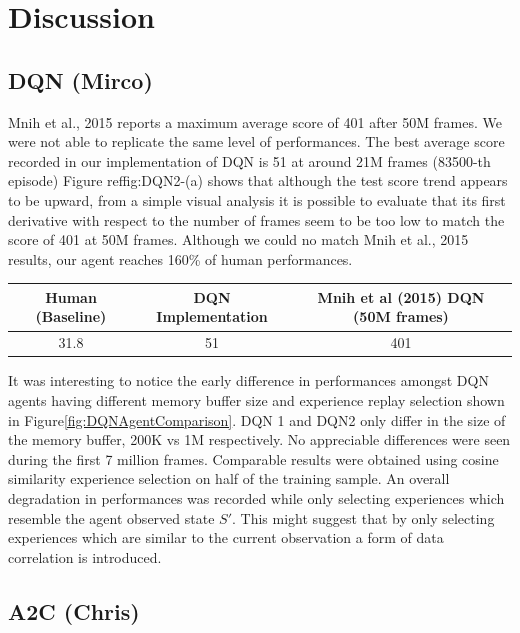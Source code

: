 \documentclass{article}
\begin{document}
\section{Discussion}
    

\subsection{DQN (Mirco)}
Mnih et al., 2015 reports a maximum average score of 401 after 50M frames. We were not able to replicate the same level of performances. The best average score recorded in our implementation of DQN is 51 at around 21M frames (83500-th episode) Figure ref{fig:DQN2}-(a) shows that although the test score trend appears to be upward, from a simple visual analysis it is possible to evaluate that its first derivative with respect to the number of frames seem to be too low to match the score of 401 at 50M frames. Although we could no match Mnih et al., 2015 results, our agent reaches 160\% of human performances.
\begin{table}[h!]
\centering
\begin{tabular}{|c | c | c |} 
 \hline
 Human (Baseline) & DQN Implementation & Mnih et al (2015) DQN (50M frames) \\ [0.5ex] 
 \hline
 31.8 & 51 & 401  \\ 
 \hline
\end{tabular}
\end{table}
It was interesting to notice the early difference in performances amongst DQN agents having different memory buffer size and experience replay selection shown in Figure\ref{fig:DQNAgentComparison}. DQN 1 and DQN2 only differ in the size of the memory buffer, 200K vs 1M respectively. No appreciable differences were seen during the first 7 million frames. Comparable results were obtained using cosine similarity experience selection on half of the training sample. An overall degradation in performances was recorded while only selecting experiences which resemble the agent observed state $S'$. This might suggest that by only selecting experiences which are similar to the current observation a form of data correlation is introduced.

\subsection{A2C (Chris)}
\end{document}

